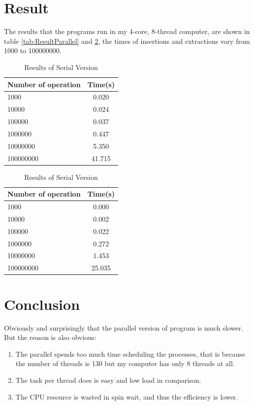 \documentclass{article}
\begin{document}
	\section{Result} %
	\label{sec:result}
	The results that the programs run in my 4-core, 8-thread computer, are shown in table \ref{tab:ResultParallel} and \ref{tab:ResultSerial}, the times of insertions and extractions vary from 1000 to 100000000.
	\begin{table}[H]
		\begin{minipage}{0.48\linewidth}
			\centering
			\caption{Results of Parallel Version}	
			\begin{tabular}{|l|c|}
			\hline
			Number of operation & Time(s) \\
			\hline 
			1000 & 0.020\\
			10000 & 0.024\\
			100000 & 0.037\\
			1000000 & 0.447\\
			10000000 & 5.350\\
			100000000 & 41.715\\
			\hline
			\end{tabular}
			\label{tab:ResultParallel}
		\end{minipage}
		\begin{minipage}{0.48\linewidth}
			\caption{Results of Serial Version}	
			\begin{tabular}{|l|c|}
			\hline
			Number of operation & Time(s) \\
			\hline 
			1000 & 0.000\\
			10000 & 0.002\\
			100000 & 0.022\\
			1000000 & 0.272\\
			10000000 & 1.453\\
			100000000 & 25.035\\
			\hline
			\end{tabular}
			\label{tab:ResultSerial}
		\end{minipage}
	\end{table}
	
	\section{Conclusion} %
	\label{sec:conclusion}
	Obviously and surprisingly that the parallel version of program is much slower. But the reason is also obvious: 
	\begin{enumerate}[1.]
	\item The parallel spends too much time scheduling the processes, that is because the number of threads is 130 but my computer has only 8 threads at all. 
	\item The task per thread does is easy and low load in comparison. 
	\item The CPU resource is wasted in spin wait, and thus the efficiency is lower.
	\end{enumerate}
\end{document}
